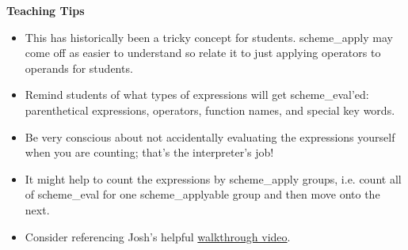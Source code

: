\begin{blocksection}
\begin{guide}
\textbf{Teaching Tips}
\begin{itemize}
	\item This has historically been a tricky concept for students. scheme\_apply may come off as easier to understand so relate it to just applying operators to operands for students.
	\item Remind students of what types of expressions will get scheme\_eval'ed: parenthetical expressions, operators, function names, and special key words.
	\item Be very conscious about not accidentally evaluating the expressions yourself when you are counting; that's the interpreter's job!
	\item It might help to count the expressions by scheme\_apply groups, i.e. count all of scheme\_eval for one scheme\_applyable group and then move onto the next.
	\item Consider referencing Josh's helpful \href{https://drive.google.com/file/d/1YH6eaOAzPx8MC0fO60bIbq9oZipC2lEd/view}{walkthrough video}.
\end{itemize}
\end{guide}
\end{blocksection}
